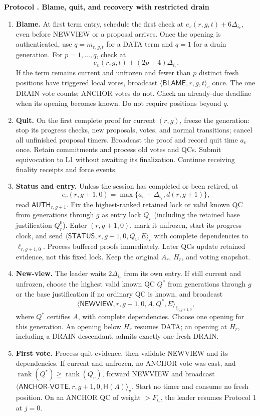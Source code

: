 \documentclass[11pt,a4paper]{article}
\newcommand{\RR}[1]{{\color{rrRed}#1}}
\newcommand{\Hash}{\mathsf H}
\newcommand{\rank}{\operatorname{rank}}
\newcommand{\tagg}[1]{\ensuremath{\mathsf{#1}}}
\newcounter{protocol}
\newenvironment{protocol}[2]{\refstepcounter{protocol}\label{#1}
\begin{mdframed}[nobreak=true,linewidth=.6pt,skipabove=8pt,skipbelow=8pt,
innertopmargin=7pt,innerbottommargin=7pt]\small
\textbf{Protocol \theprotocol. #2}\par\smallskip}{\end{mdframed}}
\begin{document}
\begin{protocol}{alg:recovery}{Blame, quit, and recovery with restricted drain}
\begin{enumerate}[label=\textbf{\arabic*)},itemsep=5pt]
\item \textbf{Blame.} At first term entry, schedule the first check at
\RR{$e_v(r,g,t)+6\Delta_{i_r}$}, even before NEWVIEW or a proposal arrives.
\RR{Once the opening is authenticated, use $q=m_{r,g,t}$ for a DATA term
and $q=1$ for a drain generation.} For $p=1,\ldots,q$, check at
\[
 e_v(r,g,t)+(2p+4)\Delta_{i_r}.
\]
If the term remains current and unfrozen and fewer than $p$ distinct
fresh positions have triggered local votes, broadcast
$\langle\tagg{BLAME},r,g,t\rangle_v$ once.
\RR{The one DRAIN vote counts; ANCHOR votes do not. Check an already-due
deadline when its opening becomes known. Do not require positions beyond $q$.}

\item \textbf{Quit.} On the first complete proof for current $(r,g)$,
freeze the generation: stop its progress checks, new proposals, votes,
and normal transitions; cancel all unfinished proposal timers.
Broadcast the proof and record quit time $a_v$ once. Retain commitments
and process old votes and QCs. Submit equivocation to L1 without awaiting
its finalization. \RR{Continue receiving finality receipts and force events.}

\item \textbf{Status and entry.} \RR{Unless the session has completed
or been retired}, at
\[
 e_v(r,g+1,0)=\max\{a_v+\Delta_{i_r},d(r,g+1)\},
\]
read $\tagg{AUTH}_{r,g+1}$. Fix the highest-ranked retained lock or valid
known QC from generations through $g$ as entry lock $Q_v$
\RR{(including the retained base justification $Q_r^0$)}.
Enter $(r,g+1,0)$, mark it unfrozen, start its progress clock, and send
$\langle\tagg{STATUS},r,g+1,0,Q_v,E\rangle_v$ with complete dependencies
to $\ell_{r,g+1,0}$. Process buffered proofs immediately. Later QCs update
retained evidence, not this fixed lock. \RR{Keep the original $A_r$,
$H_r$, and voting snapshot.}

\item \textbf{New-view.} The leader waits $2\Delta_{i_r}$ from its own
entry. If still current and unfrozen, choose the highest valid known QC
$Q^*$ from generations through $g$ \RR{or the base justification if no
ordinary QC is known}, and broadcast
\[
 \langle\tagg{NEWVIEW},r,g+1,0,A,Q^*,E\rangle_{\ell_{r,g+1,0}},
\]
where $Q^*$ certifies $A$, with complete dependencies. Choose one opening
for this generation. \RR{An opening below $H_r$ resumes DATA; an opening
at $H_r$, including a DRAIN descendant, admits exactly one fresh DRAIN.}

\item \textbf{First vote.} Process quit evidence, then validate NEWVIEW
and its dependencies. If current and unfrozen, no ANCHOR vote was cast,
and $\rank(Q^*)\ge\rank(Q_v)$, forward NEWVIEW and broadcast
$\langle\tagg{ANCHOR\mbox{-}VOTE},r,g+1,0,\Hash(A)\rangle_v$.
Start no timer and consume no fresh position. On an ANCHOR QC
\RR{of weight $>F_{i_r}$}, the leader resumes Protocol 1 at $j=0$.
\end{enumerate}
\end{protocol}
\end{document}
